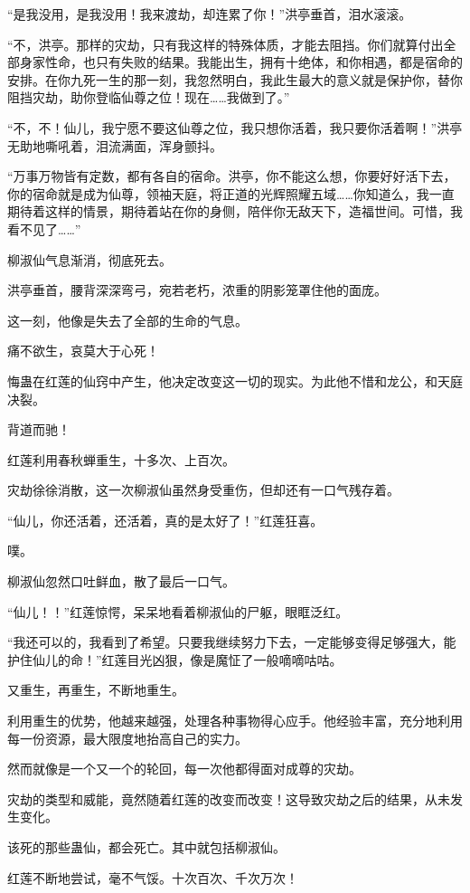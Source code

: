 \begin{this_body}
“是我没用，是我没用！我来渡劫，却连累了你！”洪亭垂首，泪水滚滚。

“不，洪亭。那样的灾劫，只有我这样的特殊体质，才能去阻挡。你们就算付出全部身家性命，也只有失败的结果。我能出生，拥有十绝体，和你相遇，都是宿命的安排。在你九死一生的那一刻，我忽然明白，我此生最大的意义就是保护你，替你阻挡灾劫，助你登临仙尊之位！现在……我做到了。”

“不，不！仙儿，我宁愿不要这仙尊之位，我只想你活着，我只要你活着啊！”洪亭无助地嘶吼着，泪流满面，浑身颤抖。

“万事万物皆有定数，都有各自的宿命。洪亭，你不能这么想，你要好好活下去，你的宿命就是成为仙尊，领袖天庭，将正道的光辉照耀五域……你知道么，我一直期待着这样的情景，期待着站在你的身侧，陪伴你无敌天下，造福世间。可惜，我看不见了……”

柳淑仙气息渐消，彻底死去。

洪亭垂首，腰背深深弯弓，宛若老朽，浓重的阴影笼罩住他的面庞。

这一刻，他像是失去了全部的生命的气息。

痛不欲生，哀莫大于心死！

悔蛊在红莲的仙窍中产生，他决定改变这一切的现实。为此他不惜和龙公，和天庭决裂。

背道而驰！

红莲利用春秋蝉重生，十多次、上百次。

灾劫徐徐消散，这一次柳淑仙虽然身受重伤，但却还有一口气残存着。

“仙儿，你还活着，还活着，真的是太好了！”红莲狂喜。

噗。

柳淑仙忽然口吐鲜血，散了最后一口气。

“仙儿！！”红莲惊愕，呆呆地看着柳淑仙的尸躯，眼眶泛红。

“我还可以的，我看到了希望。只要我继续努力下去，一定能够变得足够强大，能护住仙儿的命！”红莲目光凶狠，像是魔怔了一般嘀嘀咕咕。

又重生，再重生，不断地重生。

利用重生的优势，他越来越强，处理各种事物得心应手。他经验丰富，充分地利用每一份资源，最大限度地抬高自己的实力。

然而就像是一个又一个的轮回，每一次他都得面对成尊的灾劫。

灾劫的类型和威能，竟然随着红莲的改变而改变！这导致灾劫之后的结果，从未发生变化。

该死的那些蛊仙，都会死亡。其中就包括柳淑仙。

红莲不断地尝试，毫不气馁。十次百次、千次万次！


\end{this_body}
